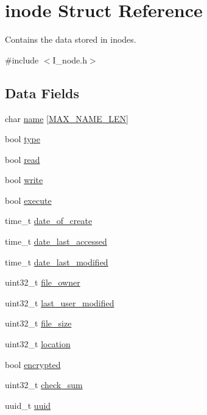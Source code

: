 \hypertarget{structinode}{\section{inode Struct Reference}
\label{structinode}
}


Contains the data stored in inodes.  




{\ttfamily \#include $<$I\-\_\-node.\-h$>$}

\subsection*{Data Fields}
\begin{DoxyCompactItemize}
\item 
char \hyperlink{structinode_af869a309a32425813b56b839f9659b24}{name} \mbox{[}\hyperlink{glob__data_8h_afd709f201d7643c3909621f620ea648a}{M\-A\-X\-\_\-\-N\-A\-M\-E\-\_\-\-L\-E\-N}\mbox{]}
\item 
bool \hyperlink{structinode_a565421f589059ae13581e05b505cf5f0}{type}
\item 
bool \hyperlink{structinode_af49a80be54293d8b153cd2a3dfd4e068}{read}
\item 
bool \hyperlink{structinode_ab4d8d1259f524270d625ab8933700d27}{write}
\item 
bool \hyperlink{structinode_a253e08d8b620206d485babf8a40d53db}{execute}
\item 
time\-\_\-t \hyperlink{structinode_a6fcc067af656e07c0d52cb7890be4a1f}{date\-\_\-of\-\_\-create}
\item 
time\-\_\-t \hyperlink{structinode_a3b1b10b96addbc06de562360c44d44c2}{date\-\_\-last\-\_\-accessed}
\item 
time\-\_\-t \hyperlink{structinode_a6c79d9f7a8c07080347292608eff8cbd}{date\-\_\-last\-\_\-modified}
\item 
uint32\-\_\-t \hyperlink{structinode_a3f405dba01154bed631df46b0a27d593}{file\-\_\-owner}
\item 
uint32\-\_\-t \hyperlink{structinode_a735957d2fe21c7a191634c86079317d0}{last\-\_\-user\-\_\-modified}
\item 
uint32\-\_\-t \hyperlink{structinode_acfc905fb689f590842c0152e3b8cd92e}{file\-\_\-size}
\item 
uint32\-\_\-t \hyperlink{structinode_a8f37ff59738c23420be43a6b1ba69769}{location}
\item 
bool \hyperlink{structinode_a8a32018f1892e247f08ea9a91f5505e6}{encrypted}
\item 
uint32\-\_\-t \hyperlink{structinode_a609a9abb9ba167b63027aad986198118}{check\-\_\-sum}
\item 
uuid\-\_\-t \hyperlink{structinode_a0c9cfc131b27ae3b98b1533bba4c58ef}{uuid}
\end{DoxyCompactItemize}


